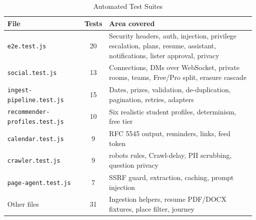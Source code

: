 \documentclass[12pt,a4paper]{report}
\begin{document}
\begin{table}[H]
\centering
\caption{Automated Test Suites}
\label{tab:suites}
\begin{tabularx}{\textwidth}{|l|c|X|}
\hline
\textbf{File} & \textbf{Tests} & \textbf{Area covered} \\
\hline
\texttt{e2e.test.js} & 20 & Security headers, auth, injection, privilege escalation, plans, resume, assistant, notifications, lister approval, privacy \\
\hline
\texttt{social.test.js} & 13 & Connections, DMs over WebSocket, private rooms, teams, Free/Pro split, erasure cascade \\
\hline
\texttt{ingest-pipeline.test.js} & 15 & Dates, prizes, validation, de-duplication, pagination, retries, adapters \\
\hline
\texttt{recommender-profiles.test.js} & 10 & Six realistic student profiles, determinism, free tier \\
\hline
\texttt{calendar.test.js} & 9 & RFC 5545 output, reminders, links, feed token \\
\hline
\texttt{crawler.test.js} & 9 & robots rules, Crawl-delay, PII scrubbing, question privacy \\
\hline
\texttt{page-agent.test.js} & 7 & SSRF guard, extraction, caching, prompt injection \\
\hline
Other files & 31 & Ingestion helpers, resume PDF/DOCX fixtures, place filter, journey \\
\hline
\end{tabularx}
\end{table}
\end{document}
